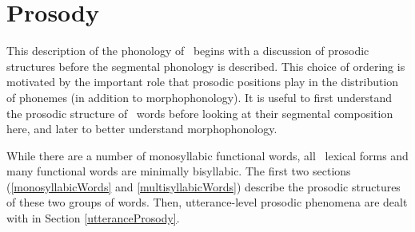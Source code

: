 


\chapter{Prosody}\label{ProsodicStructure}

This description of the phonology of \PS\ begins with a discussion of prosodic structures before the segmental phonology is described. This choice of ordering is motivated by the important role that prosodic positions play in the distribution of phonemes (in addition to morphophonology). It is useful to first understand the prosodic structure of \PS\ words before looking at their segmental composition here, and later to better understand morphophonology. 

While there are a number of monosyllabic functional words, all \PS\ lexical forms and many functional words are minimally bisyllabic. 
The first two sections (\ref{monosyllabicWords} and \ref{multisyllabicWords}) describe the prosodic structures of these two groups of words.  
Then, utterance-level prosodic phenomena are dealt with in Section \ref{utteranceProsody}.

